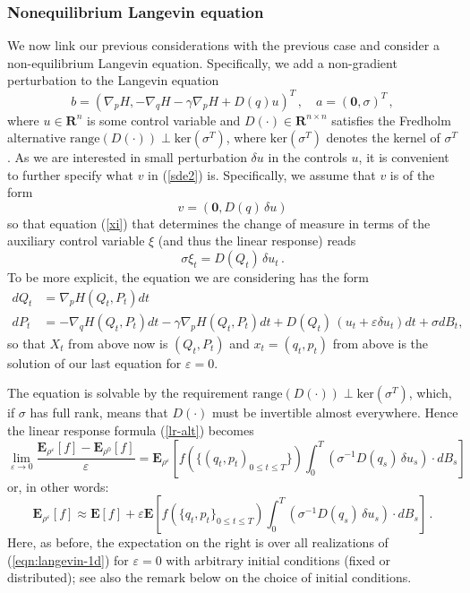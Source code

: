 \documentclass[]{tMPH2e}
\newcommand{\R}{{\mathbf R}}
\newcommand{\eps}{\varepsilon}
\newcommand{\bE}{{\mathbf E}}
\newcommand{\zero}{{\mathbf 0}}
\begin{document}
\subsubsection*{Nonequilibrium Langevin equation}

We now link our previous considerations with the previous case and consider a non-equilibrium Langevin equation. Specifically, we add a non-gradient perturbation to the Langevin equation 
\begin{equation}\label{eqn:langevin-1b}
b = \left(\nabla_{p}H, -\nabla_{q} H - \gamma\nabla_{p}H  + D(q) u \right)^{T}\,,\quad a= (\zero,\sigma)^{T}\,,
\end{equation}
where $u\in\R^{n}$ is some control variable and $D(\cdot)\in\R^{n\times n}$ satisfies the Fredholm alternative $\mathrm{range}(D(\cdot))\perp \mathrm{ker}(\sigma^{T})$, where $\mathrm{ker}(\sigma^T)$ denotes the kernel of $\sigma^T$. As we are interested in small perturbation $\delta u$ in the controls $u$, it is convenient to further specify what $v$ in (\ref{sde2}) is. Specifically, we assume that $v$ is of the form 
\begin{equation}\label{eqn:langevin-1c}
v = (\zero, D(q)\,\delta u)
\end{equation}
so that equation (\ref{xi}) that determines the change of measure in terms of the auxiliary control variable $\xi$ (and thus the linear response) reads 
\[
\sigma \xi_{t} = D(Q_{t})\,\delta u_{t}\,.
\]
To be more explicit, the equation we are considering has the form
\begin{equation}\label{eqn:langevin-1d}
\begin{aligned}
dQ_t & =  \nabla_p H(Q_t,P_t)dt\\
dP_t & =  -\nabla_q H(Q_t,P_t)dt - \gamma \nabla_p H(Q_t,P_t)dt + D(Q_t)\,(u_t+\eps \delta u_t)dt+\sigma dB_t,
\end{aligned}
\end{equation}
so that $X_t$ from above now is $(Q_t,P_t)$ and $x_t=(q_t,p_t)$ from above is the solution of our last equation for $\eps=0$.

The equation is solvable by the requirement  $\mathrm{range}(D(\cdot))\perp \mathrm{ker}(\sigma^{T})$, which, if $\sigma$ has full rank, means that $D(\cdot)$ must be invertible almost everywhere. Hence the linear response formula (\ref{lr-alt})  becomes
\begin{equation}\label{lr-alt2}
\lim_{\eps\to 0}\frac{\bE_{\rho^{\eps}}[f] - \bE_{\rho^{0}}[f]}{\eps} =  \bE_{\rho^{\eps}}\left[f(\{(q_{t},p_{t})_{0\le t\le T}\})\int_{0}^{T}(\sigma^{-1}D(q_{s})\,\delta u_{s})\cdot dB_{s} \right]\,
\end{equation}
or, in other words: 
\begin{equation}\label{eqn:neq-response}
\bE_{\rho^{\eps}}[f] \approx \bE[f] + \eps\bE\left[f(\{q_{t},p_{t}\}_{0\le t\le T})\int_{0}^{T}(\sigma^{-1}D(q_{s})\,\delta u_{s})\cdot dB_{s} \right]\,.
\end{equation}
Here, as before, the expectation on the right is over all realizations of (\ref{eqn:langevin-1d}) for $\eps=0$ with arbitrary initial conditions (fixed or distributed); see also the remark below on the choice of initial conditions. 
\end{document}
